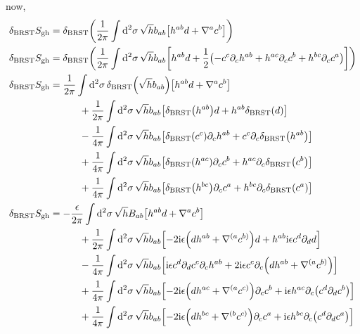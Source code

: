 now,
\begin{align*}
    \delta_{\textnormal{BRST}}S_{\textnormal{gh}}&=\delta_{\textnormal{BRST}}\qty(\frac{1}{2\pi}\int\dd[2]{\sigma}\sqrt{h}b_{ab}\qty[h^{ab}d+\nabla^{a}c^{b}])\\
    \delta_{\textnormal{BRST}}S_{\textnormal{gh}}&=\delta_{\textnormal{BRST}}\qty(\frac{1}{2\pi}\int\dd[2]{\sigma}\sqrt{h}b_{ab}\qty[h^{ab}d+\frac12\qty(-c^c\partial_ch^{ab}+h^{ac}\partial_cc^b+h^{bc}\partial_cc^a)])\\
    \delta_{\textnormal{BRST}}S_{\textnormal{gh}}&=\frac{1}{2\pi}\int\dd[2]{\sigma}\delta_{\textnormal{BRST}}\qty(\sqrt{h}b_{ab})\qty[h^{ab}d+\nabla^ac^b]\\
    &\quad\quad\quad+\frac{1}{2\pi}\int\dd[2]{\sigma}\sqrt{h}b_{ab}\qty[\delta_{\textnormal{BRST}}\qty(h^{ab})d+h^{ab}\delta_{\textnormal{BRST}}\qty(d)]\\
    &\quad\quad\quad-\frac{1}{4\pi}\int\dd[2]{\sigma}\sqrt{h}b_{ab}\qty[\delta_{\textnormal{BRST}}\qty(c^c)\partial_ch^{ab}+c^c\partial_c\delta_{\textnormal{BRST}}\qty(h^{ab})]\\
    &\quad\quad\quad+\frac{1}{4\pi}\int\dd[2]{\sigma}\sqrt{h}b_{ab}\qty[\delta_{\textnormal{BRST}}\qty(h^{ac})\partial_cc^b+h^{ac}\partial_c\delta_{\textnormal{BRST}}\qty(c^b)]\\
    &\quad\quad\quad+\frac{1}{4\pi}\int\dd[2]{\sigma}\sqrt{h}b_{ab}\qty[\delta_{\textnormal{BRST}}\qty(h^{bc})\partial_cc^a+h^{bc}\partial_c\delta_{\textnormal{BRST}}\qty(c^a)]\\
    \delta_{\textnormal{BRST}}S_{\textnormal{gh}}&=-\frac{\epsilon}{2\pi}\int\dd[2]{\sigma}\sqrt{h}B_{ab}\qty[h^{ab}d+\nabla^ac^b]\\
    &\quad\quad\quad+\frac{1}{2\pi}\int\dd[2]{\sigma}\sqrt{h}b_{ab}\qty[-2\im\epsilon\qty(dh^{ab}+\nabla^{(a}c^{b)})d+h^{ab}\im\epsilon c ^d\partial_d d]\\
    &\quad\quad\quad-\frac{1}{4\pi}\int\dd[2]{\sigma}\sqrt{h}b_{ab}\qty[\im\epsilon c^d\partial_dc^c\partial_ch^{ab}+2\im\epsilon c^c\partial_c\qty(dh^{ab}+\nabla^{(a}c^{b)})]\\
    &\quad\quad\quad+\frac{1}{4\pi}\int\dd[2]{\sigma}\sqrt{h}b_{ab}\qty[-2\im\epsilon\qty(dh^{ac}+\nabla^{(a}c^{c)})\partial_cc^b+\im\epsilon h^{ac}\partial_c\qty(c^d\partial_dc^b)]\\
    &\quad\quad\quad+\frac{1}{4\pi}\int\dd[2]{\sigma}\sqrt{h}b_{ab}\qty[-2\im\epsilon\qty(dh^{bc}+\nabla^{(b}c^{c)})\partial_cc^a+\im\epsilon h^{bc}\partial_c\qty(c^d\partial_d c^a)]\\

\end{align*}
